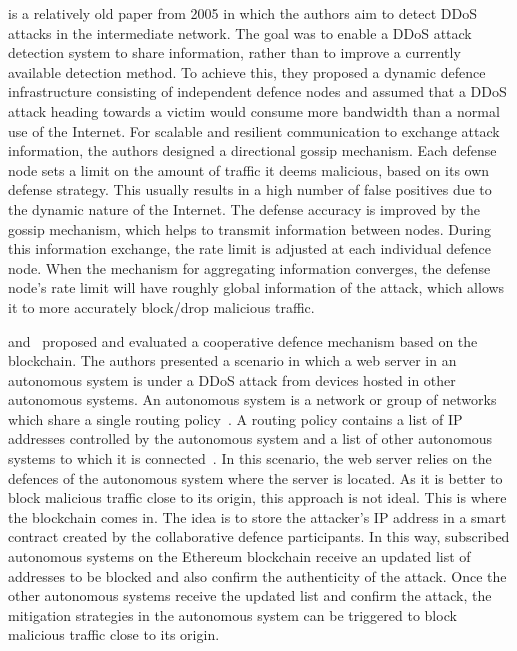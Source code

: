\cite{article:Zhang} is a relatively old paper from 2005 in which the authors aim to detect DDoS attacks in the intermediate network. The goal was to enable a DDoS attack detection system to share information, rather than to improve a currently available detection method. To achieve this, they proposed a dynamic defence infrastructure consisting of independent defence nodes and assumed that a DDoS attack heading towards a victim would consume more bandwidth than a normal use of the Internet. For scalable and resilient communication to exchange attack information, the authors designed a directional gossip mechanism. Each defense node sets a limit on the amount of traffic it deems malicious, based on its own defense strategy. This usually results in a high number of false positives due to the dynamic nature of the Internet. The defense accuracy is improved by the gossip mechanism, which helps to transmit information between nodes. During this information exchange, the rate limit is adjusted at each individual defence node.
When the mechanism for aggregating information converges, the defense node's rate limit will have roughly global information of the attack, which allows it to more accurately block/drop malicious traffic.


\cite{article:RodiguesBlockchain} and~\cite{article:RodriguesEvaluation} proposed and evaluated a cooperative defence mechanism based on the blockchain. The authors presented a scenario in which a web server in an autonomous system is under a DDoS attack from devices hosted in other autonomous systems. An autonomous system is a network or group of networks which share a single routing policy~\cite{website:cloudFlare}. A routing policy contains a list of IP addresses controlled by the autonomous system and a list of other autonomous systems to which it is connected~\cite{website:cloudFlare}.
In this scenario, the web server relies on the defences of the autonomous system where the server is located. As it is better to block malicious traffic close to its origin, this approach is not ideal. This is where the blockchain comes in. The idea is to store the attacker's IP address in a smart contract created by the collaborative defence participants. In this way, subscribed autonomous systems on the Ethereum blockchain receive an updated list of addresses to be blocked and also confirm the authenticity of the attack. Once the other autonomous systems receive the updated list and confirm the attack, the mitigation strategies in the autonomous system can be triggered to block malicious traffic close to its origin.


